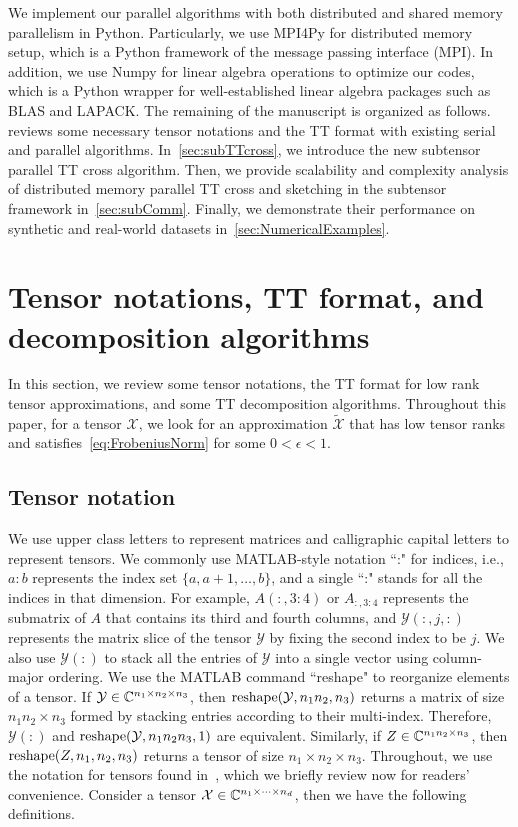 \documentclass[11pt,a4paper,review]{siamart220329}
\begin{document}
We implement our parallel algorithms with both distributed and shared memory parallelism in Python. Particularly, we use MPI4Py for distributed memory setup, which is a Python framework of the message passing interface (MPI). In addition, we use Numpy for linear algebra operations to optimize our codes, which is a Python wrapper for well-established linear algebra packages such as BLAS and LAPACK. The remaining of the manuscript is organized as follows.~ reviews some necessary tensor notations and the TT format with existing serial and parallel algorithms. In~\cref{sec:subTTcross}, we introduce the new subtensor parallel TT cross algorithm. Then, we provide scalability and complexity analysis of distributed memory parallel TT cross and sketching in the subtensor framework in~\cref{sec:subComm}. Finally, we demonstrate their performance on synthetic and real-world datasets in~\cref{sec:NumericalExamples}. 



\section{Tensor notations, TT format, and decomposition algorithms} \label{sec:background}
In this section, we review some tensor notations, the TT format for low rank tensor approximations, and some TT decomposition algorithms. Throughout this paper, for a tensor $\mathcal{X}$, we look for an approximation $\tilde{\mathcal{X}}$ that has low tensor ranks and satisfies~\cref{eq:FrobeniusNorm} for some $0 < \epsilon < 1$.

\subsection{Tensor notation} \label{sec:notation}
We use upper class letters to represent matrices and calligraphic capital letters to represent tensors. We commonly use MATLAB-style notation ``:" for indices, i.e., $a\!:\!b$ represents the index set $\{a,a+1,\ldots,b\}$, and a single ``:" stands for all the indices in that dimension. For example, $A(:,3\!:\!4)$ or $A_{:,3:4}$ represents the submatrix of $A$ that contains its third and fourth columns, and $\mathcal{Y}(:,j,:)$ represents the matrix slice of the tensor $\mathcal{Y}$ by fixing the second index to be $j$. We also use $\mathcal{Y}(:)$ to stack all the entries of $\mathcal{Y}$ into a single vector using column-major ordering. We use the MATLAB command ``reshape" to reorganize elements of a tensor. If $\mathcal{Y} \in \mathbb{C}^{n_1 \times n_2 \times n_3}$, then ${\rm reshape}(\mathcal{Y},n_1n_2,n_3)$ returns a matrix of size $n_1n_2 \times n_3$ formed by stacking entries according to their multi-index. Therefore, $\mathcal{Y}(:)$ and ${\rm reshape}(\mathcal{Y},n_1n_2n_3,1)$ are equivalent. Similarly, if $Z \in \mathbb{C}^{n_1 n_2 \times n_3}$, then ${\rm reshape}(Z,n_1,n_2,n_3)$ returns a tensor of size $n_1 \times n_2 \times n_3$. Throughout, we use the notation for tensors found in~\cite{kolda2009tensor}, which we briefly review now for readers' convenience. Consider a tensor $\mathcal{X}\in\mathbb{C}^{n_1\times\cdots\times n_d}$, then we have the following definitions.
\end{document}
